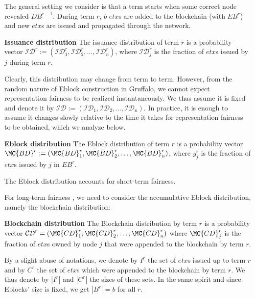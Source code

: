 The general setting we consider is that a term starts when some correct node revealed $DB^{r-1}$. During term $r$, $b$ $etx$s are added to the blockchain (with $EB^r$) and new $etx$s are issued and propagated through the network.

\begin{definition}{\textbf{Issuance distribution}}
The issuance distribution of term $r$ is a probability vector $\mathcal{ID}^r:=(\mathcal{ID}^r_1,\mathcal{ID}^r_2,\dots,\mathcal{ID}^r_n)$, where $\mathcal{ID}^r_j$ is the fraction of $etx$s issued by $j$ during term $r$.
\end{definition}
Clearly, this distribution may change from term to term. However, from the random nature of Eblock construction in Gruffalo, we cannot expect representation fairness to be realized instantaneously. We thus assume it is fixed and denote it by $\mathcal{ID}:=(\mathcal{ID}_1,\mathcal{ID}_2,\dots,\mathcal{ID}_n)$. In practice, it is enough to assume it changes slowly relative to the time it takes for representation fairness to be obtained, which we analyze below.

\begin{definition}{\textbf{Eblock distribution}}
The Eblock distribution of term $r$ is a probability vector $\MC{BD}^r:=(\MC{BD}^r_1,\MC{BD}^r_2,\dots,\MC{BD}^r_n)$, where $y^r_j$ is the fraction of $etx$s issued by $j$ in $EB^r$. 
\end{definition} 
The Eblock distribution accounts for short-term fairness. 

For long-term fairness , we need to consider the accumulative Eblock distribution, namely the blockchain distribution:
\begin{definition}{\textbf{Blockchain distribution}} 
The Blockchain distribution by term $r$ is a probability vector $\mathcal{CD}^r= \left( \MC{CD}^r_1,\MC{CD}^r_2,\dots,\MC{CD}^r_n \right)$ where $\MC{CD}_j^r$ is the fraction of $etx$s owned by node $j$ that were appended to the blockchain by term $r$. 
\end{definition}
By a slight abuse of notations, we denote by $I^r$ the set of $etx$s issued up to term $r$ and by $C^r$ the set of $etx$s which were appended to the blockchain by term $r$. We thus denote by $|I^r|$ and $|C^r|$ the sizes of these sets. In the same spirit and since Eblocks' size is fixed, we get $|B^r|=b$ for all $r$.

